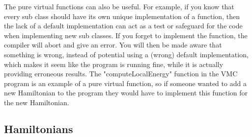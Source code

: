 \documentclass[../main.tex]{subfiles}
\begin{document}
The pure virtual functions can also be useful. For example, if you know that every sub class should have its own unique implementation of a function, then the lack of a default implementation can act as a test or safeguard for the code when implementing new sub classes. If you forget to implement the function, the compiler will abort and give an error. You will then be made aware that something is wrong, instead of potential using a (wrong) default implementation, which makes it seem like the program is running fine, while it is actually providing erroneous results. The "computeLocalEnergy" function in the VMC program is an example of a pure virtual function, so if someone wanted to add a new Hamiltonian to the program they would have to implement this function for the new Hamiltonian.

\subsection{Hamiltonians}\label{sec:Hamiltonians}
\end{document}
